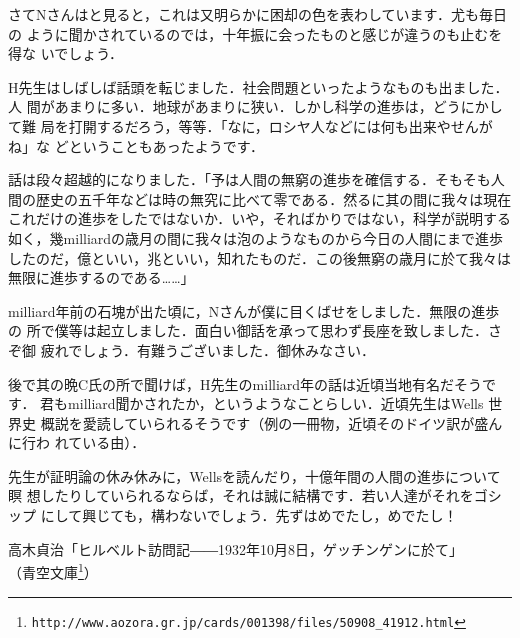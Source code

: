 \documentclass{ltjsarticle}
\begin{document}
さてNさんはと見ると，これは又明らかに困却の色を表わしています．尤も毎日の
ように聞かされているのでは，十年振に会ったものと感じが違うのも止むを得な
いでしょう．

H先生はしばしば話頭を転じました．社会問題といったようなものも出ました．人
間があまりに多い．地球があまりに狭い．しかし科学の進歩は，どうにかして難
局を打開するだろう，等等．「なに，ロシヤ人などには何も出来やせんがね」な
どということもあったようです．

話は段々超越的になりました．「予は人間の無窮の進歩を確信する．そもそも人
間の歴史の五千年などは時の無究に比べて零である．然るに其の間に我々は現在
これだけの進歩をしたではないか．いや，そればかりではない，科学が説明する
如く，幾milliardの歳月の間に我々は泡のようなものから今日の人間にまで進歩
したのだ，億といい，兆といい，知れたものだ．この後無窮の歳月に於て我々は
無限に進歩するのである……」

milliard年前の石塊が出た頃に，Nさんが僕に目くばせをしました．無限の進歩の
所で僕等は起立しました．面白い御話を承って思わず長座を致しました．さぞ御
疲れでしょう．有難うございました．御休みなさい．

後で其の晩C氏の所で聞けば，H先生のmilliard年の話は近頃当地有名だそうです．
君もmilliard聞かされたか，というようなことらしい．近頃先生はWells 世界史
概説を愛読していられるそうです（例の一冊物，近頃そのドイツ訳が盛んに行わ
れている由）．

先生が証明論の休み休みに，Wellsを読んだり，十億年間の人間の進歩について瞑
想したりしていられるならば，それは誠に結構です．若い人達がそれをゴシップ
にして興じても，構わないでしょう．先ずはめでたし，めでたし！


\raggedleft 高木貞治「ヒルベルト訪問記――1932年10月8日，ゲッチンゲンに於て」\\
（青空文庫\footnote{\verb+http://www.aozora.gr.jp/cards/001398/files/50908_41912.html+}）
\end{document}
